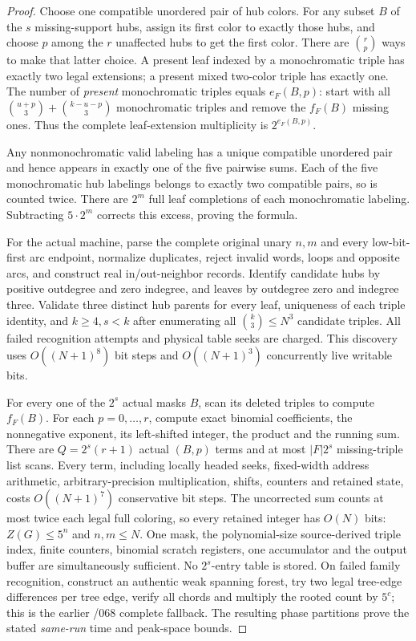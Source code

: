 \documentclass[11pt]{article}
\begin{document}
\begin{proof}
Choose one compatible unordered pair of hub colors.
For any subset $B$ of the $s$ missing-support hubs,
assign its first color to exactly those hubs, and choose
$p$ among the $r$ unaffected hubs to get the first color.
There are $\binom rp$ ways to make that latter choice.
A present leaf indexed by a monochromatic triple has
exactly two legal extensions; a present mixed two-color
triple has exactly one. The number of
\emph{present} monochromatic triples equals $e_F(B,p)$:
start with all $\binom{u+p}{3}+\binom{k-u-p}{3}$
monochromatic triples and remove the $f_F(B)$ missing
ones. Thus the complete leaf-extension multiplicity is
$2^{e_F(B,p)}$.

Any nonmonochromatic valid labeling has a unique compatible
unordered pair and hence appears in exactly one of the five
pairwise sums. Each of the five monochromatic hub labelings
belongs to exactly two compatible pairs, so is counted twice.
There are $2^m$ full leaf completions of each monochromatic
labeling. Subtracting $5\cdot2^m$ corrects this excess,
proving the formula.

For the actual machine, parse the complete original unary
$n,m$ and every low-bit-first arc endpoint, normalize duplicates,
reject invalid words, loops and opposite arcs, and construct
real in/out-neighbor records. Identify candidate hubs by
positive outdegree and zero indegree, and leaves by
outdegree zero and indegree three. Validate three distinct
hub parents for every leaf, uniqueness of each triple identity,
and $k\ge4,s<k$ after enumerating all
$\binom{k}{3}\le N^3$ candidate triples.
All failed recognition attempts and physical table seeks are charged.
This discovery uses $O((N+1)^8)$ bit steps and
$O((N+1)^3)$ concurrently live writable bits.

For every one of the $2^s$ actual masks $B$,
scan its deleted triples to compute $f_F(B)$.
For each $p=0,\ldots,r$, compute exact binomial coefficients,
the nonnegative exponent, its left-shifted integer,
the product and the running sum. There are
$Q=2^s(r+1)$ actual $(B,p)$ terms and at most
$|F|2^s$ missing-triple list scans.
Every term, including locally headed seeks, fixed-width
address arithmetic, arbitrary-precision multiplication,
shifts, counters and retained state, costs
$O((N+1)^7)$ conservative bit steps.
The uncorrected sum counts at most twice each legal full
coloring, so every retained integer has $O(N)$ bits:
$Z(G)\le5^n$ and $n,m\le N$.
One mask, the polynomial-size source-derived triple index,
finite counters, binomial scratch registers, one accumulator
and the output buffer are simultaneously sufficient.
No $2^s$-entry table is stored.
On failed family recognition, construct an authentic weak
spanning forest, try two legal tree-edge differences per
tree edge, verify all chords and multiply the rooted count by
$5^c$; this is the earlier /068 complete fallback.
The resulting phase partitions prove the stated \emph{same-run}
time and peak-space bounds.
\end{proof}
\end{document}
